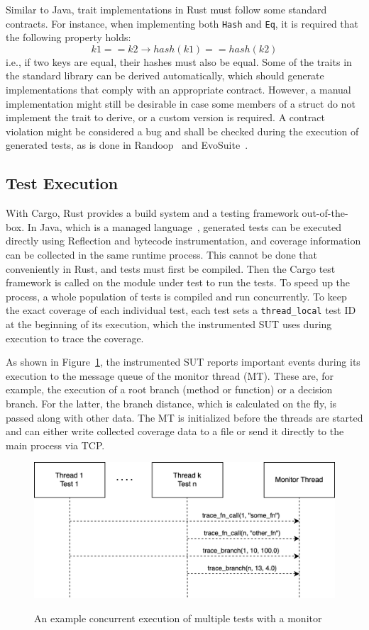 \documentclass{article}
\begin{document}
Similar to Java, trait implementations in Rust must follow some standard contracts. For instance, when implementing both \lstinline{Hash} and \lstinline{Eq}, it is required that the following property holds:
\[
k1 == k2 \longrightarrow hash(k1) == hash(k2)
\]
i.e., if two keys are equal, their hashes must also be equal. Some of the traits in the standard library can be derived automatically, which should generate implementations that comply with an appropriate contract. However, a manual implementation might still be desirable in case some members of a struct do not implement the trait to derive, or a custom version is required. A contract violation might be considered a bug and shall be checked during the execution of generated tests, as is done in Randoop~\cite{Pacheco_2007} and EvoSuite~\cite{Fraser2013}.

\subsection{Test Execution}
With Cargo, Rust provides a build system and a testing framework out-of-the-box. In Java, which is a managed language~\cite{Gough2005}, generated tests can be executed directly using Reflection and bytecode instrumentation, and coverage information can be collected in the same runtime process. This cannot be done that conveniently in Rust, and tests must first be compiled. Then the Cargo test framework is called on the module under test to run the tests. To speed up the process, a whole population of tests is compiled and run concurrently. To keep the exact coverage of each individual test, each test sets a \lstinline{thread_local} test ID at the beginning of its execution, which the instrumented \ac{SUT} uses during execution to trace the coverage.

As shown in Figure~\ref{fig:test-execution}, the instrumented \ac{SUT} reports important events during its execution to the message queue of the monitor thread (MT). These are, for example, the execution of a root branch (method or function) or a decision branch. For the latter, the branch distance, which is calculated on the fly, is passed along with other data. The MT is initialized before the threads are started and can either write collected coverage data to a file or send it directly to the main process via TCP.

\begin{figure}[h]
\caption{An example concurrent execution of multiple tests with a monitor}
\centering
\includegraphics[width=\textwidth]{test-execution}
\label{fig:test-execution}
\end{figure}
\end{document}
